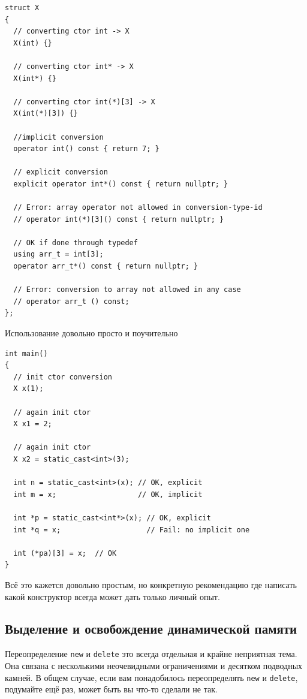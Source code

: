 \documentclass[a4paper,12pt,oneside]{article}
\begin{document}
\begin{lstlisting}
struct X 
{
  // converting ctor int -> X
  X(int) {}

  // converting ctor int* -> X
  X(int*) {}

  // converting ctor int(*)[3] -> X
  X(int(*)[3]) {}

  //implicit conversion
  operator int() const { return 7; }
 
  // explicit conversion
  explicit operator int*() const { return nullptr; }
 
  // Error: array operator not allowed in conversion-type-id
  // operator int(*)[3]() const { return nullptr; }

  // OK if done through typedef
  using arr_t = int[3];
  operator arr_t*() const { return nullptr; } 

  // Error: conversion to array not allowed in any case
  // operator arr_t () const; 
};
\end{lstlisting}
 
Использование довольно просто и поучительно

\begin{lstlisting}
int main()
{
  // init ctor conversion
  X x(1);

  // again init ctor
  X x1 = 2;

  // again init ctor
  X x2 = static_cast<int>(3);
 
  int n = static_cast<int>(x); // OK, explicit
  int m = x;                   // OK, implicit
 
  int *p = static_cast<int*>(x); // OK, explicit
  int *q = x;                    // Fail: no implicit one
 
  int (*pa)[3] = x;  // OK
}
\end{lstlisting}

Всё это кажется довольно простым, но конкретную рекомендацию где написать какой конструктор всегда может дать только личный опыт.

\pagebreak
\subsection{Выделение и освобождение динамической памяти}\label{MemManage}

Переопределение \lstinline!new! и \lstinline!delete! это всегда отдельная и крайне неприятная тема. Она связана с несколькими неочевидными ограничениями и десятком подводных камней. В общем случае, если вам понадобилось переопределять \lstinline!new! и \lstinline!delete!, подумайте ещё раз, может быть вы что-то сделали не так.
\end{document}
